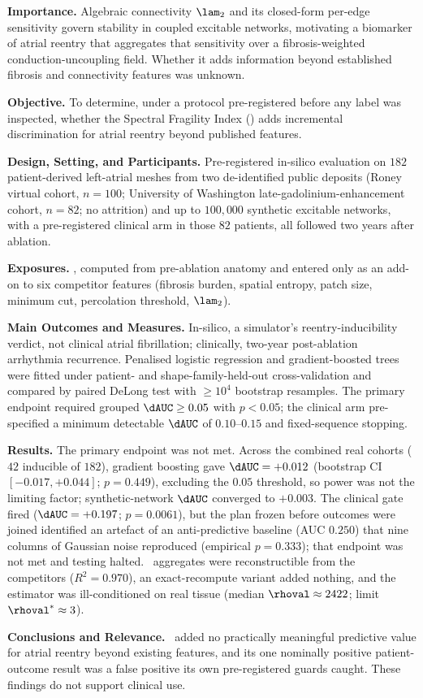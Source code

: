 ﻿\noindent\textbf{Importance.} Algebraic connectivity $\lam_2$ and its
closed-form per-edge sensitivity govern stability in coupled excitable networks,
motivating a biomarker of atrial reentry that aggregates that sensitivity over a
fibrosis-weighted conduction-uncoupling field. Whether it adds information
beyond established fibrosis and connectivity features was unknown.

\medskip
\noindent\textbf{Objective.} To determine, under a protocol pre-registered
before any label was inspected, whether the Spectral Fragility Index (\SFI)
adds incremental discrimination for atrial reentry beyond published features.

\medskip
\noindent\textbf{Design, Setting, and Participants.} Pre-registered in-silico
evaluation on $182$ patient-derived left-atrial meshes from two
de-identified public deposits (Roney virtual cohort, $n=100$; University of Washington
late-gadolinium-enhancement cohort, $n=82$; no attrition) and up to $100{,}000$
synthetic excitable networks, with a pre-registered clinical arm in those $82$
patients, all followed two years after ablation.

\medskip
\noindent\textbf{Exposures.} \SFI, computed from pre-ablation anatomy and
entered only as an add-on to six competitor features (fibrosis burden, spatial
entropy, patch size, minimum cut, percolation threshold, $\lam_2$).

\medskip
\noindent\textbf{Main Outcomes and Measures.} In-silico, a simulator's
reentry-inducibility verdict, not clinical atrial fibrillation; clinically,
two-year post-ablation arrhythmia recurrence. Penalised logistic regression and
gradient-boosted trees were fitted under patient- and shape-family-held-out
cross-validation and compared by paired DeLong test with $\geq10^{4}$ bootstrap
resamples. The primary endpoint required grouped $\dAUC\geq0.05$ with $p<0.05$;
the clinical arm pre-specified a minimum detectable $\dAUC$ of $0.10$--$0.15$
and fixed-sequence stopping.

\medskip
\noindent\textbf{Results.} The primary endpoint was not met. Across the combined
real cohorts ($42$ inducible of $182$), gradient boosting gave $\dAUC=+0.012$
(bootstrap CI $[-0.017,+0.044]$; $p=0.449$), excluding the $0.05$ threshold, so
power was not the limiting factor; synthetic-network $\dAUC$ converged to
$+0.003$. The clinical gate fired ($\dAUC=+0.197$; $p=0.0061$), but the plan
frozen before outcomes were joined identified an artefact of an anti-predictive
baseline (AUC $0.250$) that nine columns of Gaussian noise reproduced (empirical
$p=0.333$); that endpoint was not met and testing halted. \SFI\ aggregates were
reconstructible from the competitors ($R^{2}=0.970$), an exact-recompute variant
added nothing, and the estimator was ill-conditioned on real tissue (median
$\rhoval\approx2422$; limit $\rhoval^{\ast}\approx3$).

\medskip
\noindent\textbf{Conclusions and Relevance.} \SFI\ added no practically
meaningful predictive value for atrial reentry beyond existing features, and its
one nominally positive patient-outcome result was a false positive its own
pre-registered guards caught. These findings do not support clinical use.
